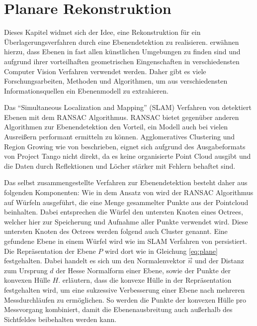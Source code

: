 \section{Planare Rekonstruktion} \label{sec:plane-reconstruction}

Dieses Kapitel widmet sich der Idee, eine Rekonstruktion für ein  Überlagerungs\-verfahren durch eine Ebenendetektion zu realisieren. \citet{yang2010plane} erwähnen hierzu, dass Ebenen in fast allen künstlichen Umgebungen zu finden sind und aufgrund ihrer vorteilhaften geometrischen Eingenschaften in verschiedensten Computer Vision Verfahren verwendet werden. Daher gibt es viele Forschungsarbeiten, Methoden und Algorithmen, um aus verschiedensten Informationsquellen ein Ebenenmodell zu extrahieren.

Das \enquote{Simultaneous Localization and Mapping} (SLAM) Verfahren von \citet{trevor2012planar} detektiert Ebenen mit dem RANSAC Algorithmus. RANSAC bietet gegenüber anderen Algorithmen zur Ebenendetektion den Vorteil, ein Modell auch bei vielen Ausreißern performant ermitteln zu können. Agglomeratives Clustering und Region Growing wie von \citet{feng2014fast} beschrieben, eignet sich aufgrund des Ausgabeformats von Project Tango nicht direkt, da es keine organisierte Point Cloud ausgibt und die Daten durch Reflektionen und Löcher stärker mit Fehlern behaftet sind. 

Das selbst zusammengestellte Verfahren zur Ebenendetektion besteht daher aus folgenden Komponenten: Wie in dem Ansatz von \citet{yang2010plane} wird der RANSAC Algorithmus auf Würfeln ausgeführt, die eine Menge gesammelter Punkte aus der Pointcloud beinhalten. Dabei entsprechen die Würfel den untersten Knoten eines Octrees, welcher hier zur Speicherung und Aufnahme aller Punkte verwendet wird. Diese untersten Knoten des Octrees werden folgend auch Cluster genannt. Eine gefundene Ebene in einem Würfel wird wie im SLAM Verfahren von \citet{trevor2012planar} persistiert. Die Repräsentation der Ebene \(P\) wird dort wie in Gleichung \ref{eq:plane} festgehalten. Dabei handelt es sich um den Normalenvektor \(\vec{n}\) und der Distanz zum Ursprung \(d\) der Hesse Normalform einer Ebene, sowie der Punkte der konvexen Hülle \(H\). \citet{trevor2012planar} erläutern, dass die konvexe Hülle in der Repräsentation festgehalten wird, um eine sukzessive Verbesserung einer Ebene nach mehreren Messdurchläufen zu ermöglichen. So werden die Punkte der konvexen Hülle pro Messvorgang kombiniert, damit die Ebenenausbreitung auch außerhalb des Sichtfeldes beibehalten werden kann. 


